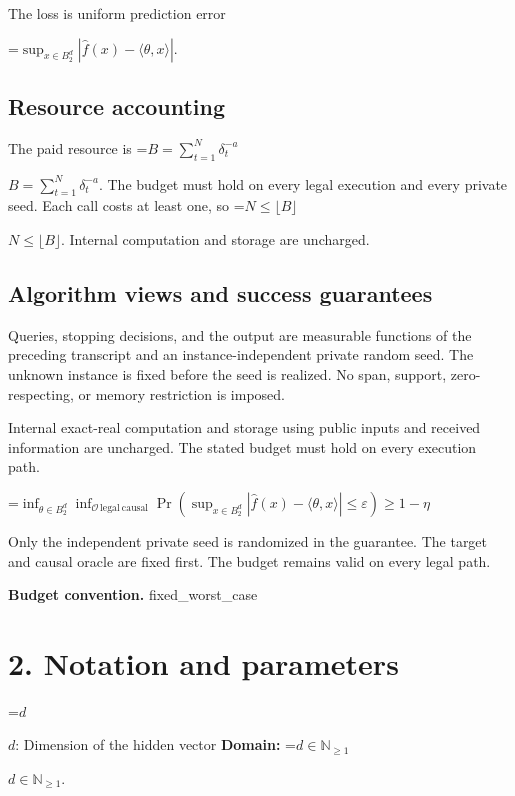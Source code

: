 \documentclass[10pt,a4paper]{article}
\newcommand{\AtlasMath}[1]{\par\begingroup\centering\setbox0=\hbox{$\displaystyle #1$}\ifdim\wd0>1.4\linewidth\typeout{ATLAS WIDE FORMULA: \the\wd0}\fi\ifdim\wd0>\linewidth\resizebox{\linewidth}{!}{\box0}\else\box0\fi\par\endgroup}
\newcommand{\AtlasInlineMath}[1]{\begingroup\setbox0=\hbox{$#1$}\ifdim\wd0>.4\linewidth\endgroup\AtlasMath{#1}\else\endgroup$#1$\fi}
\begin{document}
The loss is uniform prediction error
\AtlasMath{\sup_{x\in B_2^d}|\widehat f(x)-\langle\theta,x\rangle|.}




\subsection{Resource accounting}


The paid resource is \AtlasInlineMath{B=\sum_{t=1}^N\delta_t^{-a}}. The budget must hold on every legal execution and every private seed. Each call costs at least one, so \AtlasInlineMath{N\le\lfloor B\rfloor}. Internal computation and storage are uncharged.



\subsection{Algorithm views and success guarantees}


Queries, stopping decisions, and the output are measurable functions of the preceding transcript and an instance-independent private random seed. The unknown instance is fixed before the seed is realized. No span, support, zero-respecting, or memory restriction is imposed.



Internal exact-real computation and storage using public inputs and received information are uncharged. The stated budget must hold on every execution path.




\AtlasMath{\inf_{\theta\in B_2^d}\inf_{\mathcal O\,\mathrm{legal\ causal}}\Pr\!\left(\sup_{x\in B_2^d}|\widehat f(x)-\langle\theta,x\rangle|\le\varepsilon\right)\ge1-\eta}




Only the independent private seed is randomized in the guarantee. The target and causal oracle are fixed first. The budget remains valid on every legal path.



\textbf{Budget convention.} fixed\_worst\_case



\section{2. Notation and parameters}


\AtlasInlineMath{d}: Dimension of the hidden vector \textbf{Domain:} \AtlasInlineMath{d\in\mathbb N_{\ge1}}.
\end{document}
